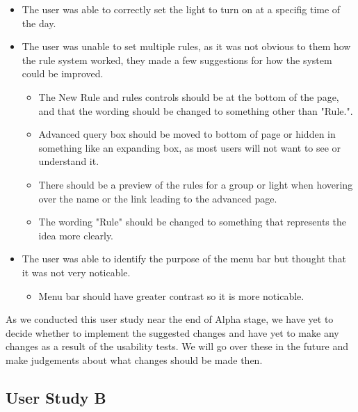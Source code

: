 \documentclass[oneside,openright]{book}
\begin{document}
\begin{itemize}
    \item The user was able to correctly set the light to turn on at a specifig
        time of the day.
    \item The user was unable to set multiple rules, as it was not obvious to
        them how the rule system worked, they made a few suggestions for how
        the system could be improved.
        \begin{itemize}
            \item The New Rule and rules controls should be at the bottom of
                the page, and that the wording should be changed to something
                other than "Rule.".
            \item Advanced query box should be moved to bottom of page or
                hidden in something like an expanding box, as most users will
                not want to see or understand it.
            \item There should be a preview of the rules for a group or light
                when hovering over the name or the link leading to the advanced
                page.
            \item The wording "Rule" should be changed to something that
                represents the idea more clearly.
        \end{itemize}
    \item The user was able to identify the purpose of the menu bar but thought
        that it was not very noticable.
        \begin{itemize}
            \item Menu bar should have greater contrast so it is more
                noticable.
        \end{itemize}
\end{itemize}

As we conducted this user study near the end of Alpha stage, we have yet to
decide whether to implement the suggested changes and have yet to make any
changes as a result of the usability tests. We will go over these in the future
and make judgements about what changes should be made then.

\subsection{User Study B}
\end{document}
